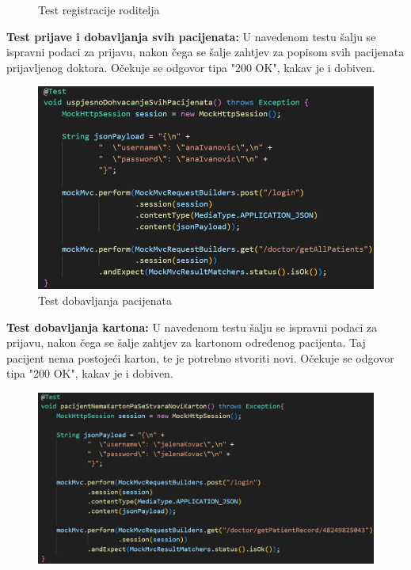 \begin{packed_enum}
\begin{figure}[H]
					\centering
					\caption{Test registracije roditelja}
					\label{fig:isjecak2}
				\end{figure}
				\item \textbf{Test prijave i dobavljanja svih pacijenata:}
				\text U navedenom testu šalju se ispravni podaci za prijavu, nakon čega se šalje zahtjev za popisom svih pacijenata prijavljenog doktora. Očekuje se odgovor tipa "200 OK", kakav je i dobiven.
				\begin{figure}[H]
					\includegraphics[scale=0.6]{slike/isjecak3.PNG} %
					\centering
					\caption{Test dobavljanja pacijenata}
					\label{fig:isjecak3}
				\end{figure}
				\item \textbf{Test dobavljanja kartona:}
				\text U navedenom testu šalju se ispravni podaci za prijavu, nakon čega se šalje zahtjev za kartonom određenog pacijenta. Taj pacijent nema postojeći karton, te je potrebno stvoriti novi. Očekuje se odgovor tipa "200 OK", kakav je i dobiven.
				\begin{figure}[H]
					\includegraphics[scale=0.6]{slike/isjecak4.PNG} %

\end{figure}
\end{packed_enum}
